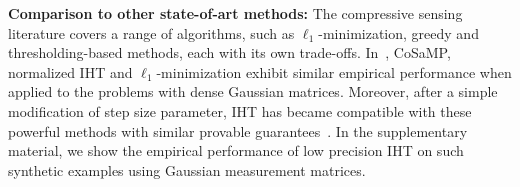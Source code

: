 \documentclass[aoas,preprint]{imsart}
\numberwithin{equation}{section}
\theoremstyle{plain}
\begin{document}
\vspace{0.5em}

{\bf Comparison to other state-of-art methods:} The compressive sensing literature covers a range of algorithms,  such as $\ell_1$-minimization, greedy and thresholding-based methods, each with its own trade-offs. In~\cite{blumensath2010niht}, CoSaMP, normalized IHT and $\ell_1$-minimization exhibit similar empirical performance when applied to the problems with dense Gaussian matrices. Moreover, after a simple modification of step size parameter, IHT has became compatible with these powerful methods with similar provable guarantees~\cite{blumensath2012greedy}. 
In the supplementary material, we show the  
empirical performance of low precision IHT on such synthetic examples using  Gaussian measurement matrices.
\end{document}
